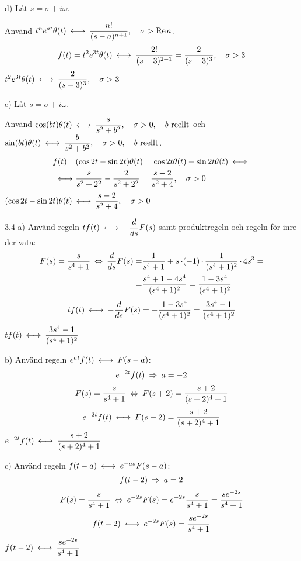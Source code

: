 \begin{task}{d)}
	Låt $s=\sigma+i\omega$.
	
	Använd $t^ne^{at}\theta(t)\llra \dfrac{n!}{(s-a)^{n+1}}\cond{\sigma > \Re a}$.
	\begin{align*}
	f(t)=
	t^2e^{3t}\theta(t)\llra
	\frac{2!}{(s-3)^{2+1}}=
	\frac{2}{(s-3)^3}\cond{\sigma > 3}
	\end{align*}
	\ans $t^2e^{3t}\theta(t)\llra\dfrac{2}{(s-3)^3}\cond{\sigma > 3}$
\end{task}

\begin{task}{e)}
	Låt $s=\sigma+i\omega$.
	
	Använd $\cos(bt)\theta(t)\llra \dfrac{s}{s^2+b^2}\cond{\sigma > 0}\cond{b\text{ reellt}}$ och \\
	$\sin(bt)\theta(t)\llra \dfrac{b}{s^2+b^2}\cond{\sigma > 0}\cond{b\text{ reellt}}$.
	\begin{align*}
	f(t)=&
	(\cos2t-\sin2t)\theta(t)=
	\cos2t\theta(t)-\sin2t\theta(t)\llra \\ \llra
	&\frac{s}{s^2+2^2}-\frac{2}{s^2+2^2}=
	\frac{s-2}{s^2+4}\cond{\sigma > 0}
	\end{align*}
	\ans $(\cos2t-\sin2t)\theta(t)\llra\dfrac{s-2}{s^2+4}\cond{\sigma > 0}$
\end{task}

\pagebreak
\begin{task}{3.4 a)}
	Använd regeln $tf(t) \llra -\dfrac{d}{ds}F(s)$ samt produktregeln och regeln för inre derivata:
	\begin{align*}
	F(s)=
	\frac{s}{s^4+1} \lra 
	\frac{d}{ds}F(s)=
	&\frac{1}{s^4+1}+s\*(-1)\*\frac{1}{(s^4+1)^2}\*4s^3= \\ =
	&\frac{s^4+1-4s^4}{(s^4+1)^2}=
	\frac{1-3s^4}{(s^4+1)^2}
	\end{align*}
	\[tf(t) \llra -\dfrac{d}{ds}F(s)=-\frac{1-3s^4}{(s^4+1)^2}=\frac{3s^4-1}{(s^4+1)^2}\]
	\ans $tf(t) \llra \dfrac{3s^4-1}{(s^4+1)^2}$
\end{task}

\begin{task}{b)}
	Använd regeln $e^{at}f(t) \llra F(s-a)$:
	\[e^{-2t}f(t) \ra a=-2\]
	\begin{align*}
	F(s)=
	\frac{s}{s^4+1} \lra 
	F(s+2)=
	\frac{s+2}{(s+2)^4+1}
	\end{align*}
	\[e^{-2t}f(t) \llra F(s+2)=\frac{s+2}{(s+2)^4+1}\]
	\ans $e^{-2t}f(t) \llra \dfrac{s+2}{(s+2)^4+1}$
\end{task}

\begin{task}{c)}
	Använd regeln $f(t-a) \llra e^{-as}F(s-a)$:
	\[f(t-2) \ra a=2\]
	\begin{align*}
	F(s)=
	\frac{s}{s^4+1} \lra 
	e^{-2s}F(s)=
	e^{-2s}\frac{s}{s^4+1}=
	\frac{se^{-2s}}{s^4+1}
	\end{align*}
	\[f(t-2) \llra e^{-2s}F(s)=\frac{se^{-2s}}{s^4+1}\]
	\ans $f(t-2) \llra \dfrac{se^{-2s}}{s^4+1}$
\end{task}

